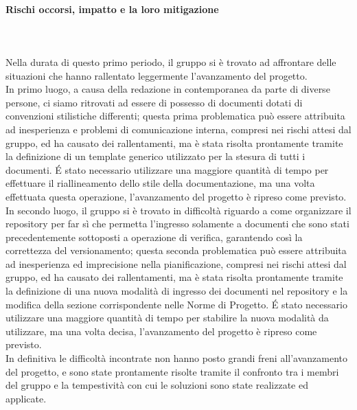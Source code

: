 \paragraph{Rischi occorsi, impatto e la loro mitigazione} \hspace{1cm} 
\\ \hspace{1cm} \\
Nella durata di questo primo periodo, il gruppo si è trovato ad affrontare delle situazioni che hanno rallentato leggermente l'avanzamento del progetto.\\
In primo luogo, a causa della redazione in contemporanea da parte di diverse persone, ci siamo ritrovati ad essere di possesso di documenti dotati di convenzioni stilistiche differenti; questa prima problematica può essere attribuita ad inesperienza e problemi di comunicazione interna, compresi nei rischi attesi dal gruppo, ed ha causato dei rallentamenti, ma è stata risolta prontamente tramite la definizione di un template generico utilizzato per la stesura di tutti i documenti. \'E stato necessario utilizzare una maggiore quantità di tempo per effettuare il riallineamento dello stile della documentazione, ma una volta effettuata questa operazione, l'avanzamento del progetto è ripreso come previsto.\\
In secondo luogo, il gruppo si è trovato in difficoltà riguardo a come organizzare il repository per far sì che permetta l'ingresso solamente a documenti che sono stati precedentemente sottoposti a operazione di verifica, garantendo così la correttezza del versionamento; questa seconda problematica può essere attribuita ad inesperienza ed imprecisione nella pianificazione, compresi nei rischi attesi dal gruppo, ed ha causato dei rallentamenti, ma è stata risolta prontamente tramite la definizione di una nuova modalità di ingresso dei documenti nel repository e la modifica della sezione corrispondente nelle Norme di Progetto. \'E stato necessario utilizzare una maggiore quantità di tempo per stabilire la nuova modalità da utilizzare, ma una volta decisa, l'avanzamento del progetto è ripreso come previsto.\\
In definitiva le difficoltà incontrate non hanno posto grandi freni all'avanzamento del progetto, e sono state prontamente risolte tramite il confronto tra i membri del gruppo e la tempestività con cui le soluzioni sono state realizzate ed applicate.

